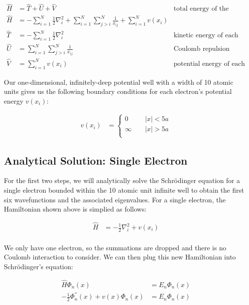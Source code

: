 \documentclass[10pt, oneside, letterpaper]{article}
\begin{document}
\begin{align*}
  \hat{H} &= \hat{T} + \hat{U} + \hat{V} & \text{total energy of the system}\\
  \hat{H} &= -\sum_{i=1}^{N}\frac{1}{2}\nabla^{2}_i + \sum_{i=1}^{N}\sum_{j>i}^{N}\frac{1}{x_{ij}} + \sum_{i=1}^{N}v(x_i)\\
  \hat{T} &= -\sum_{i=1}^{N}\frac{1}{2}\nabla^{2}_i & \text{kinetic energy of each electron}\\
  \hat{U} &= \sum_{i=1}^{N}\sum_{j>i}^{N}\frac{1}{x_{ij}} & \text{Coulomb repulsion between electrons}\\
  \hat{V} &= \sum_{i=1}^{N}v(x_i) & \text{potential energy of each electron}
\end{align*}

Our one-dimensional, infinitely-deep potential well with a width of 10 atomic units gives us the following boundary conditions for each electron's potential energy $v(x_i)$:

\begin{align*}
  v(x_i) &= \begin{cases}
          0       \quad \, & |x| < 5a \\
          \infty  \quad \, & |x| > 5a \\
     \end{cases}
\end{align*}

\subsection{Analytical Solution: Single Electron}

For the first two steps, we will analytically solve the Schr\"{o}dinger equation for a single electron bounded within the 10 atomic unit infinite well to obtain the first six wavefunctions and the associated eigenvalues. For a single electron, the Hamiltonian shown above is simplied as follows:

\begin{align*}
  \hat{H} &= -\frac{1}{2}\nabla^{2}_i + v(x_i)\\
\end{align*}

We only have one electron, so the summations are dropped and there is no Coulomb interaction to consider. We can then plug this new Hamiltonian into Schr\"{o}dinger's equation:

\begin{align*}
  \hat{H}\Phi_n(x) &= {E_n}\Phi_n(x) \\
  -\frac{1}{2}\Phi^{''}_n(x) + v(x)\Phi_n(x) &= {E_n}\Phi_n(x)
\end{align*}
\end{document}

